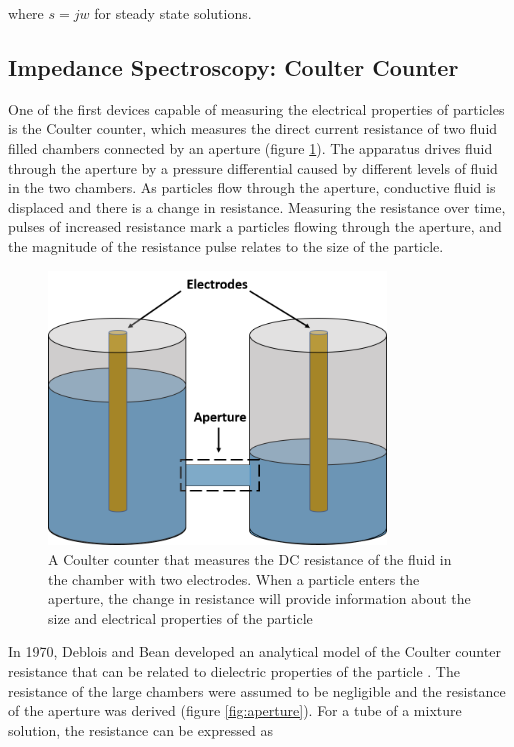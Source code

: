  \noindent where $s=jw$ for steady state solutions.

\subsection*{Impedance Spectroscopy: Coulter Counter}
\par One of the first devices capable of measuring the electrical properties of particles is the Coulter counter, which measures the direct current resistance of two fluid filled chambers connected by an aperture (figure \ref{fig:coulter_counter}). The apparatus drives fluid through the aperture by a pressure differential caused by different levels of fluid in the two chambers. As particles flow through the aperture, conductive fluid is displaced and there is a change in resistance. Measuring the resistance over time, pulses of increased resistance mark a particles flowing through the aperture, and the magnitude of the resistance pulse relates to the size of the particle. 


\begin{figure}[ht]
    \centering
    \includegraphics[width=0.8\textwidth]{images/coultierCounter.png}
    \caption[Illustration of Coulter counter principles]{A Coulter counter that measures the DC resistance of the fluid in the chamber with two electrodes. When a particle enters the aperture, the change in resistance will provide information about the size and electrical properties of the particle}
    \label{fig:coulter_counter}
\end{figure}


In 1970, Deblois and Bean developed an analytical model of the Coulter counter resistance that can be related to dielectric properties of the particle \cite{deblois_counting_1970}. The resistance of the large chambers were assumed to be negligible and the resistance of the aperture was derived (figure \ref{fig:aperture}). For a tube of a mixture solution, the resistance can be expressed as

